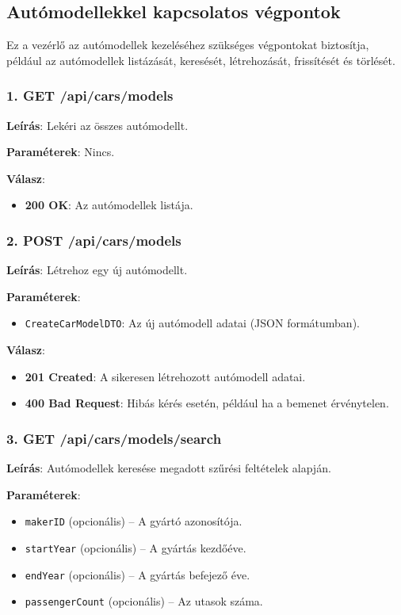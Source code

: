 \documentclass{report}[11pt]
\begin{document}
\subsection{Autómodellekkel kapcsolatos végpontok}

Ez a vezérlő az autómodellek kezeléséhez szükséges végpontokat biztosítja, például az autómodellek listázását, keresését, létrehozását, frissítését és törlését.

\subsubsection{1. GET /api/cars/models}

\textbf{Leírás}:  
Lekéri az összes autómodellt.

\textbf{Paraméterek}:  
Nincs.

\textbf{Válasz}:  
\begin{itemize}
    \item \textbf{200 OK}: Az autómodellek listája.
\end{itemize}

\subsubsection{2. POST /api/cars/models}

\textbf{Leírás}:  
Létrehoz egy új autómodellt.

\textbf{Paraméterek}:  
\begin{itemize}
    \item \texttt{CreateCarModelDTO}: Az új autómodell adatai (JSON formátumban).
\end{itemize}

\textbf{Válasz}:  
\begin{itemize}
    \item \textbf{201 Created}: A sikeresen létrehozott autómodell adatai.
    \item \textbf{400 Bad Request}: Hibás kérés esetén, például ha a bemenet érvénytelen.
\end{itemize}

\subsubsection{3. GET /api/cars/models/search}

\textbf{Leírás}:  
Autómodellek keresése megadott szűrési feltételek alapján.

\textbf{Paraméterek}:  
\begin{itemize}
    \item \texttt{makerID} (opcionális) – A gyártó azonosítója.
    \item \texttt{startYear} (opcionális) – A gyártás kezdőéve.
    \item \texttt{endYear} (opcionális) – A gyártás befejező éve.
    \item \texttt{passengerCount} (opcionális) – Az utasok száma.
\end{itemize}
\end{document}
